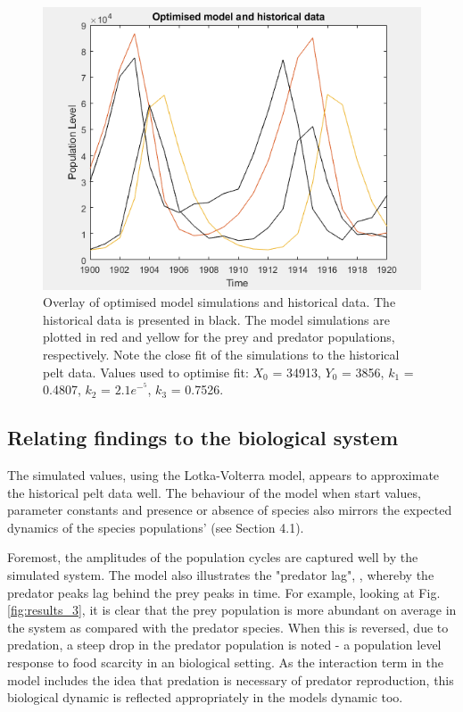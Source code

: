 \documentclass{article}
\begin{document}
\begin{figure}[H]
    \includegraphics[width = \textwidth]{optimised.PNG}
    \caption{Overlay of optimised model simulations and historical data. The historical data is presented in black. The model simulations are plotted in red and yellow for the prey and predator populations, respectively. Note the close fit of the simulations to the historical pelt data. Values used to optimise fit:  $X_0$ = 34913, $Y_0$ = 3856, $k_1$ = 0.4807, $k_2$ = $2.1e^-^5$, $k_3$ = 0.7526. }
    \label{fig:optimised}
\end{figure}



\subsection{Relating findings to the biological system}
The simulated values, using the Lotka-Volterra model, appears to approximate the historical pelt data well. The behaviour of the model when start values, parameter constants and presence or absence of species also mirrors the expected dynamics of the species populations' (see Section 4.1). 

Foremost, the amplitudes of the population cycles are captured well by the simulated system. The model also illustrates the "predator lag", \parencite{tyson_modelling_2010}, whereby the predator peaks lag behind the prey peaks in time. For example, looking at Fig. \ref{fig:results_3}, it is clear that the prey population is more abundant on average in the system as compared with the predator species.  When this is reversed, due to predation, a steep drop in the predator population is noted - a population level response to food scarcity in an biological setting. As the interaction term in the model includes the idea that predation is necessary of predator reproduction, this biological dynamic is reflected appropriately in the models dynamic too. 
\end{document}
